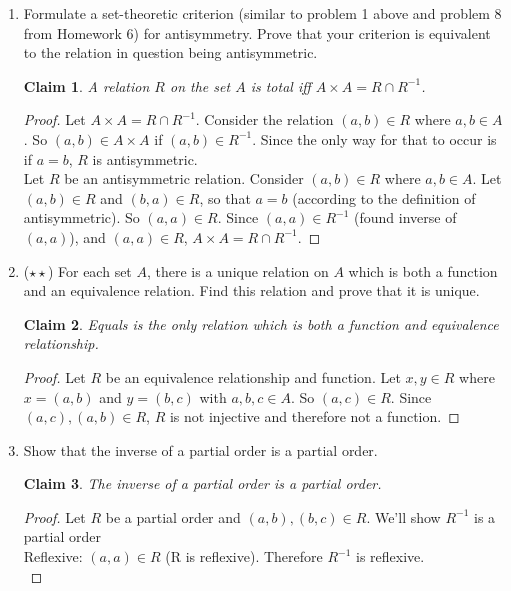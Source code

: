 \documentclass[11pt]{letter}
\newtheorem{claim}{Claim}
\theoremstyle{definition}
\begin{document}
\begin{enumerate}
          
	\item Formulate a set-theoretic criterion (similar to problem 1 above and problem 8 from Homework 6) for antisymmetry. Prove that your criterion is equivalent to the relation in question being antisymmetric.
          \begin{claim}
            A relation $R$ on the set $A$ is total iff $A\times A=R\cap R^{-1}$.
          \end{claim}
          \begin{proof}
            Let $A\times A=R\cap R^{-1}$. Consider the relation $(a,b)\in R$ where $a,b\in A$. So $(a,b) \in A\times A$ if $(a,b)\in R^{-1}$. Since the only way for that to occur is if $a=b$, $R$ is antisymmetric.\\
            Let $R$ be an antisymmetric relation. Consider $(a,b)\in R$ where $a,b\in A$. Let $(a,b)\in R$ and $(b,a)\in R$, so that $a=b$ (according to the definition of antisymmetric). So $(a,a)\in R$. Since $(a,a)\in R^{-1}$ (found inverse of $(a,a)$), and $(a,a)\in R$, $A\times A= R\cap R^{-1}$.
          \end{proof}
	\item ($\star\star$) For each set $A$, there is a unique relation on $A$ which is both a function and an equivalence relation. Find this relation and prove that it is unique.
          \begin{claim}
            Equals is the only relation which is both a function and equivalence relationship.
          \end{claim}
          \begin{proof}
            Let $R$ be an equivalence relationship and function. Let $x,y\in R$ where $x=(a,b)$ and $y=(b,c)$ with $a,b,c\in A$. So $(a,c)\in R$. Since $(a,c),(a,b)\in R$, $R$ is not injective and therefore not a function. 
          \end{proof}
		\item Show that the inverse of a partial order is a partial order.
                  \begin{claim}
                    The inverse of a partial order is a partial order.
                  \end{claim}
                  \begin{proof}
                    Let $R$ be a partial order and $(a,b),(b,c)\in R$. We'll show $R^{-1}$ is a partial order \\
                    Reflexive: $(a,a)\in R$ (R is reflexive). Therefore $R^{-1}$ is reflexive.\\

\end{proof}
\end{enumerate}
\end{document}
